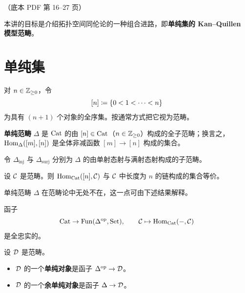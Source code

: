 \begin{center}\small\color{black!55}（底本 PDF 第 16–27 页）\end{center}

本讲的目标是介绍拓扑空间同伦论的一种组合进路，即\textbf{单纯集的 Kan--Quillen 模型范畴}。

\section{单纯集}

\begin{definition}\label{L3-1.1}
对 $n\in\mathbb{Z}_{\ge 0}$，令
\[
[n]\coloneqq\{0<1<\cdots<n\}
\]
为具有 $(n+1)$ 个对象的全序集。按通常方式把它视为范畴。
\end{definition}

\begin{definition}\label{L3-1.2}
\textbf{单纯范畴} $\Delta$ 是 $\operatorname{Cat}$ 的由 $[n]\in\operatorname{Cat}$（$n\in\mathbb{Z}_{\ge 0}$）构成的全子范畴；换言之，$\operatorname{Hom}_{\Delta}([m],[n])$ 是全体非减函数 $[m]\to[n]$ 构成的集合。

令 $\Delta_{\mathrm{inj}}$ 与 $\Delta_{\mathrm{surj}}$ 分别为 $\Delta$ 的由单射态射与满射态射构成的子范畴。
\end{definition}

\nitem\label{L3-1.3}
设 $\mathcal{C}$ 是范畴。则 $\operatorname{Hom}_{\operatorname{Cat}}([n],\mathcal{C})$ 与 $\mathcal{C}$ 中长度为 $n$ 的链构成的集合等价。

单纯范畴 $\Delta$ 在范畴论中无处不在，这一点可由下述结果解释。

\begin{proposition}\label{L3-1.4}
函子
\begin{equation}\label{L3-eq1.1}
\operatorname{Cat}\to\operatorname{Fun}(\Delta^{\mathrm{op}},\operatorname{Set}),\qquad \mathcal{C}\mapsto\operatorname{Hom}_{\operatorname{Cat}}(-,\mathcal{C})
\end{equation}
是全忠实的。
\end{proposition}

\begin{definition}\label{L3-1.5}
设 $\mathcal{D}$ 是范畴。
\begin{itemize}[leftmargin=2.2em,itemsep=0.1em]
\item $\mathcal{D}$ 的一个\textbf{单纯对象}是函子 $\Delta^{\mathrm{op}}\to\mathcal{D}$。
\item $\mathcal{D}$ 的一个\textbf{余单纯对象}是函子 $\Delta\to\mathcal{D}$。
\end{itemize}
\end{definition}

